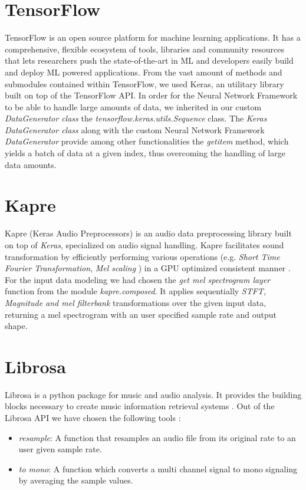 \section{TensorFlow}
TensorFlow is an open source platform for machine learning applications. It has a comprehensive, flexible ecosystem of tools, libraries and community resources that lets researchers push the state-of-the-art in ML and developers easily build and deploy ML powered applications.\cite{tf}
From the vast amount of methods and submodules contained within TensorFlow, we used Keras, an utilitary library
built on top of the TensorFlow API. In order for the Neural Network Framework to be able to handle large amounts
of data, we inherited in our custom \textit{DataGenerator class} the \textit{tensorflow.keras.utils.Sequence}
class. The \textit{Keras DataGenerator class} along with the custom Neural Network Framework \textit{DataGenerator}
provide among other functionalities the \textit{getitem} method, which yields a batch of data at a given index, thus overcoming the handling of large data amounts.

\section{Kapre}
Kapre (Keras Audio Preprocessors) is an audio data preprocessing library built on top of \textit{Keras},
specialized on audio signal handling.\cite{choi2017kapre}
Kapre facilitates sound transformation by efficiently performing various operations (e.g. \textit{Short
Time Fourier Transformation}, \textit{Mel scaling} ) in a GPU optimized consistent manner . For the input data modeling we had chosen the
\textit{get mel spectrogram layer} function from the module \textit{kapre.composed}. It applies sequentially
\textit{STFT, Magnitude and mel filterbank} transformations over the given input data, returning a mel spectrogram
with an user specified sample rate and output shape.
\section{Librosa}
Librosa is a python package for music and audio analysis. It provides the building blocks necessary to create music information retrieval systems \cite{mcfee2015librosa}.
Out of the Librosa API we have chosen the following tools :
\begin{itemize}
	\item \textit{resample}: A function that resamples an audio file from its original rate to an user
		given sample rate.

	\item \textit{to mono}: A function which converts a multi channel signal to mono signaling by averaging
		the sample values.
\end{itemize}
